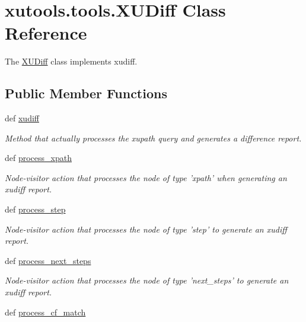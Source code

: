 \hypertarget{classxutools_1_1tools_1_1_x_u_diff}{\section{xutools.\-tools.\-X\-U\-Diff Class Reference}
\label{classxutools_1_1tools_1_1_x_u_diff}
}


The \hyperlink{classxutools_1_1tools_1_1_x_u_diff}{X\-U\-Diff} class implements xudiff.  


\subsection*{Public Member Functions}
\begin{DoxyCompactItemize}
\item 
def \hyperlink{classxutools_1_1tools_1_1_x_u_diff_a32ae7725526ae8bc87a40143b417c987}{xudiff}
\begin{DoxyCompactList}\small\item\em Method that actually processes the xupath query and generates a difference report. \end{DoxyCompactList}\item 
def \hyperlink{classxutools_1_1tools_1_1_x_u_diff_aa7bb458dcc56e8ab717b805913fed32c}{process\-\_\-xpath}
\begin{DoxyCompactList}\small\item\em Node-\/visitor action that processes the node of type 'xpath' when generating an xudiff report. \end{DoxyCompactList}\item 
def \hyperlink{classxutools_1_1tools_1_1_x_u_diff_ace2c8ff5ab3a60e528e7eb82e5fadbc8}{process\-\_\-step}
\begin{DoxyCompactList}\small\item\em Node-\/visitor action that processes the node of type 'step' to generate an xudiff report. \end{DoxyCompactList}\item 
def \hyperlink{classxutools_1_1tools_1_1_x_u_diff_a145d44b7f5c094752ca5382fea77f614}{process\-\_\-next\-\_\-steps}
\begin{DoxyCompactList}\small\item\em Node-\/visitor action that processes the node of type 'next\-\_\-steps' to generate an xudiff report. \end{DoxyCompactList}\item 
def \hyperlink{classxutools_1_1tools_1_1_x_u_diff_a7bf9e28759bc729b4327f8f7dc7e92e4}{process\-\_\-cf\-\_\-match}

\end{DoxyCompactItemize}
